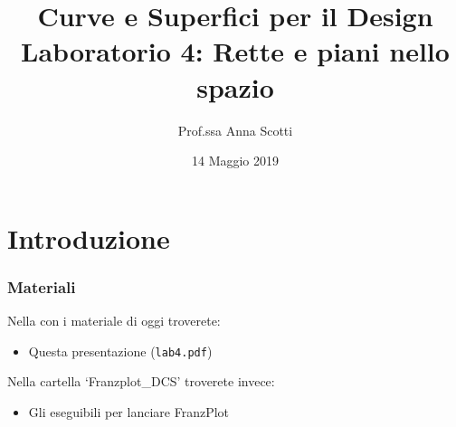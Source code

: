 \documentclass{beamer}
\title[Curve e Sup. - Lab 4]{Curve e Superfici per il Design \\ Laboratorio 4: Rette e piani nello spazio}
\author[Prof.ssa Scotti]{Prof.ssa Anna Scotti}
\date{14 Maggio 2019}
\newcommand{\frnzplt}{FranzPlot }
\begin{document}
\begin{frame}
\maketitle
\end{frame}
\section{Introduzione}
\begin{frame}
\frametitle{Materiali}
Nella con i materiale di oggi troverete:
\begin{itemize}
\item Questa presentazione (\texttt{lab4.pdf})
\end{itemize}
Nella cartella `Franzplot\_DCS' troverete invece:
\begin{itemize}
\item Gli eseguibili per lanciare \frnzplt
\end{itemize}
\end{frame}
\end{document}

